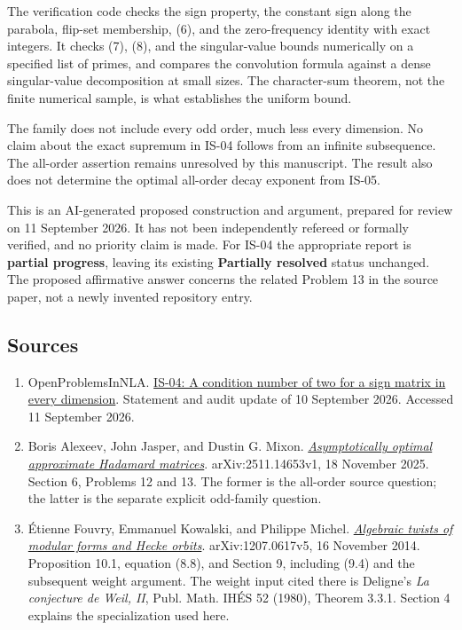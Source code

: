 \documentclass[
  11pt,
]{article}
\begin{document}
The verification code checks the sign property, the constant sign along
the parabola, flip-set membership, (6), and the zero-frequency identity
with exact integers. It checks (7), (8), and the singular-value bounds
numerically on a specified list of primes, and compares the convolution
formula against a dense singular-value decomposition at small sizes. The
character-sum theorem, not the finite numerical sample, is what
establishes the uniform bound.

The family does not include every odd order, much less every dimension.
No claim about the exact supremum in IS-04 follows from an infinite
subsequence. The all-order assertion remains unresolved by this
manuscript. The result also does not determine the optimal all-order
decay exponent from IS-05.

This is an AI-generated proposed construction and argument, prepared for
review on 11 September 2026. It has not been independently refereed or
formally verified, and no priority claim is made. For IS-04 the
appropriate report is \textbf{partial progress}, leaving its existing
\textbf{Partially resolved} status unchanged. The proposed affirmative
answer concerns the related Problem 13 in the source paper, not a newly
invented repository entry.

\subsection{Sources}\label{sources}

\begin{enumerate}
\def\labelenumi{\arabic{enumi}.}
\item
  OpenProblemsInNLA.
  \href{https://github.com/ajt60gaibb/OpenProblemsInNLA/blob/main/eigenvalues-and-inverse-problems/IS-04/README.md}{IS-04:
  A condition number of two for a sign matrix in every dimension}.
  Statement and audit update of 10 September 2026. Accessed 11 September
  2026.
\item
  Boris Alexeev, John Jasper, and Dustin G. Mixon.
  \href{https://arxiv.org/html/2511.14653v1}{\emph{Asymptotically
  optimal approximate Hadamard matrices}}. arXiv:2511.14653v1, 18
  November 2025. Section 6, Problems 12 and 13. The former is the
  all-order source question; the latter is the separate explicit
  odd-family question.
\item
  Étienne Fouvry, Emmanuel Kowalski, and Philippe Michel.
  \href{https://arxiv.org/html/1207.0617v5}{\emph{Algebraic twists of
  modular forms and Hecke orbits}}. arXiv:1207.0617v5, 16 November 2014.
  Proposition 10.1, equation (8.8), and Section 9, including (9.4) and
  the subsequent weight argument. The weight input cited there is
  Deligne's \emph{La conjecture de Weil, II}, Publ. Math. IHÉS 52
  (1980), Theorem 3.3.1. Section 4 explains the specialization used
  here.
\end{enumerate}
\end{document}
